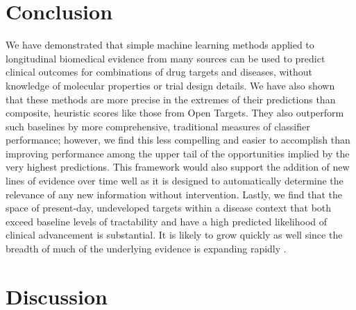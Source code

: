 \documentclass{article}
\begin{document}
\section{Conclusion}

We have demonstrated that simple machine learning methods applied to longitudinal biomedical evidence from many sources can be used to predict clinical outcomes for combinations of drug targets and diseases, without knowledge of molecular properties or trial design details. We have also shown that these methods are more precise in the extremes of their predictions than composite, heuristic scores like those from Open Targets. They also outperform such baselines by more comprehensive, traditional measures of classifier performance; however, we find this less compelling and easier to accomplish than improving performance among the upper tail of the opportunities implied by the very highest predictions. This framework would also support the addition of new lines of evidence over time well as it is designed to automatically determine the relevance of any new information without intervention.  Lastly, we find that the space of present-day, undeveloped targets within a disease context that both exceed baseline levels of tractability and have a high predicted likelihood of clinical advancement is substantial. It is likely to grow quickly as well since the breadth of much of the underlying evidence is expanding rapidly \cite{PMID:33214558,PMID:36634672,PMID:31491408}.

\section{Discussion}
\label{sec:discussion}
\end{document}
